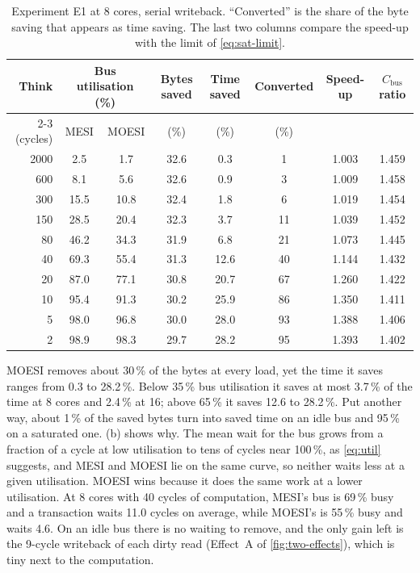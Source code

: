 \begin{table}[htbp]
\centering
\caption{Experiment E1 at 8 cores, serial writeback. ``Converted'' is the share of
the byte saving that appears as time saving. The last two columns compare the
speed-up with the limit of \cref{eq:sat-limit}.}
\label{tab:res-h2}
\small
\begin{tabular}{@{}r c c c c c c c@{}}
\toprule
Think & \multicolumn{2}{c}{Bus utilisation (\%)} & Bytes saved & Time saved & Converted & Speed-up & $C_{\mathrm{bus}}$ ratio \\
\cmidrule(lr){2-3}
(cycles) & MESI & MOESI & (\%) & (\%) & (\%) & & \\
\midrule
2000 & 2.5 & 1.7 & 32.6 & 0.3 & 1 & 1.003 & 1.459 \\
600 & 8.1 & 5.6 & 32.6 & 0.9 & 3 & 1.009 & 1.458 \\
300 & 15.5 & 10.8 & 32.4 & 1.8 & 6 & 1.019 & 1.454 \\
150 & 28.5 & 20.4 & 32.3 & 3.7 & 11 & 1.039 & 1.452 \\
80 & 46.2 & 34.3 & 31.9 & 6.8 & 21 & 1.073 & 1.445 \\
40 & 69.3 & 55.4 & 31.3 & 12.6 & 40 & 1.144 & 1.432 \\
20 & 87.0 & 77.1 & 30.8 & 20.7 & 67 & 1.260 & 1.422 \\
10 & 95.4 & 91.3 & 30.2 & 25.9 & 86 & 1.350 & 1.411 \\
5 & 98.0 & 96.8 & 30.0 & 28.0 & 93 & 1.388 & 1.406 \\
2 & 98.9 & 98.3 & 29.7 & 28.2 & 95 & 1.393 & 1.402 \\
\bottomrule
\end{tabular}
\end{table}

MOESI removes about 30\,\% of the bytes at every load, yet the time it saves ranges
from 0.3 to 28.2\,\%. Below 35\,\% bus utilisation it saves at most 3.7\,\% of the
time at 8 cores and 2.4\,\% at 16; above 65\,\% it saves 12.6 to 28.2\,\%. Put
another way, about 1\,\% of the saved bytes turn into saved time on an idle bus and
95\,\% on a saturated one. (b) shows why. The mean wait for the bus
grows from a fraction of a cycle at low utilisation to tens of cycles near
100\,\%, as \cref{eq:util} suggests, and MESI and MOESI lie on the same curve, so
neither waits less at a given utilisation. MOESI wins because it does the same work
at a lower utilisation. At 8 cores with 40 cycles of computation, MESI's bus is
69\,\% busy and a transaction waits 11.0 cycles on average, while MOESI's is 55\,\%
busy and waits 4.6. On an idle bus there is no waiting to remove, and the only gain
left is the 9-cycle writeback of each dirty read (Effect~A of
\cref{fig:two-effects}), which is tiny next to the computation.

